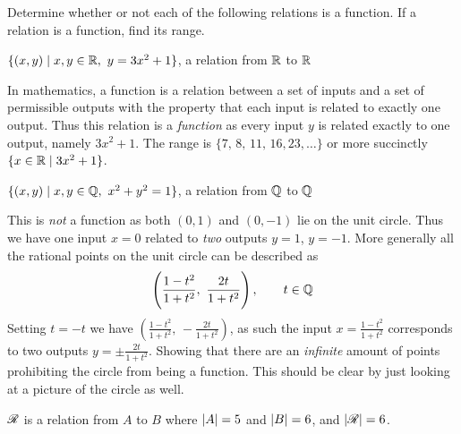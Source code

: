\documentclass[a4paper, english, 12pt]{article} %
\begin{document}
\titlebox


\begin{problem}
  Determine whether or not each of the following relations is a function. If a
  relation is a function, find its range.
\end{problem}

\begin{subproblem}[3]
  $\{ (x, y) \mid x,y \in \mathbb{R}, \ y = 3x^2 + 1 \}$, a relation from $\mathbb{R}$ to $\mathbb{R}$
\end{subproblem}

\begin{answer}
  In mathematics, a function is a relation between a set of inputs and a set
  of permissible outputs with the property that each input is related to exactly
  one output.
  Thus this relation is a \emph{function} as every input $y$ is related exactly to one output,
  namely $3x^2 + 1$. The range is $\{7,\,8,\,11,\,16,23,\ldots\}$ or more
  succinctly $\{x \in \mathbb{R} \mid 3x^2 + 1\}$.
\end{answer}

\begin{subproblem}
  $\{ (x, y) \mid x,y \in \mathbb{Q}, \ x^2 + y^2 = 1 \}$, a relation from $\mathbb{Q}$ to $\mathbb{Q}$
\end{subproblem}

\begin{answer}
  This is \emph{not} a function as both $(0,1)$ and $(0,-1)$ lie on the unit
  circle. Thus we have one input $x=0$ related to \emph{two} outputs $y=1$, $y=-1$.
  More generally all the rational points on the unit
  circle can be described as
  \begin{equation*}
    \left( \frac{1 - t^2}{1 + t^2} ,\ \frac{2t}{1 + t^2} \right), \qquad t \in \mathbb{Q}
  \end{equation*}
  Setting $t=-t$ we have $(\frac{1-t^2}{1+t^2}, \, - \frac{2t}{1+t^2})$, as such
  the input $x = \frac{1-t^2}{1+t^2}$ corresponds to two outputs $y=\pm
  \frac{2t}{1+t^2}$. Showing that there are an \emph{infinite} amount of points
  prohibiting the circle from being a function. This should be clear by just
  looking at a picture of the circle as well. 
\end{answer}

\begin{subproblem}
  $\mathscr{R}$ is a relation from $A$ to $B$ where $\lvert A\rvert=5$ and $\lvert B\rvert=6$, and $\lvert\mathscr{R}\rvert=6$.
\end{subproblem}
\end{document}
